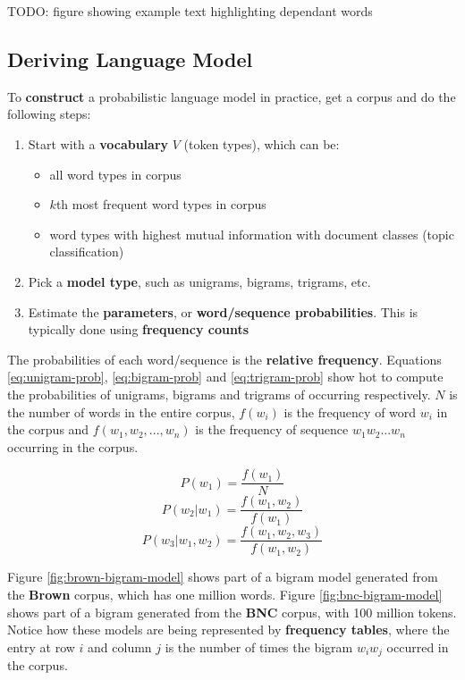 \documentclass{article}
\begin{document}
TODO: figure showing example text highlighting dependant words

\subsection{Deriving Language Model}

To \textbf{construct} a probabilistic language model in practice, get a corpus and do the following steps:
\begin{enumerate}
	\item Start with a \textbf{vocabulary} $V$ (token types), which can be:
	\begin{itemize}
		\item all word types in corpus
		\item $k$th most frequent word types in corpus
		\item word types with highest mutual information with document classes (topic classification)
	\end{itemize}
	\item Pick a \textbf{model type}, such as unigrams, bigrams, trigrams, etc.
	\item Estimate the \textbf{parameters}, or \textbf{word/sequence probabilities}. This is typically done using \textbf{frequency counts}
\end{enumerate}

The probabilities of each word/sequence is the \textbf{relative frequency}. Equations \ref{eq:unigram-prob}, \ref{eq:bigram-prob} and \ref{eq:trigram-prob} show hot to compute the probabilities of unigrams, bigrams and trigrams of occurring respectively. $N$ is the number of words in the entire corpus, $f(w_i)$ is the frequency of word $w_i$ in the corpus and $f(w_1, w_2, ..., w_n)$ is the frequency of sequence $w_1w_2...w_n$ occurring in the corpus.

\begin{equation}
	P(w_1) = \frac{f(w_1)}{N}
	\label{eq:unigram-prob}
\end{equation}
\begin{equation}
	P(w_2|w_1) = \frac{f(w_1, w_2)}{f(w_1)}
	\label{eq:bigram-prob}
\end{equation}
\begin{equation}
	P(w_3|w_1,w_2) = \frac{f(w_1, w_2, w_3)}{f(w_1, w_2)}
	\label{eq:trigram-prob}
\end{equation}

Figure \ref{fig:brown-bigram-model} shows part of a bigram model generated from the \textbf{Brown} corpus, which has one million words. Figure \ref{fig:bnc-bigram-model} shows part of a bigram generated from the \textbf{BNC} corpus, with 100 million tokens. Notice how these models are being represented by \textbf{frequency tables}, where the entry at row $i$ and column $j$ is the number of times the bigram $w_i w_j$ occurred in the corpus.
\end{document}
